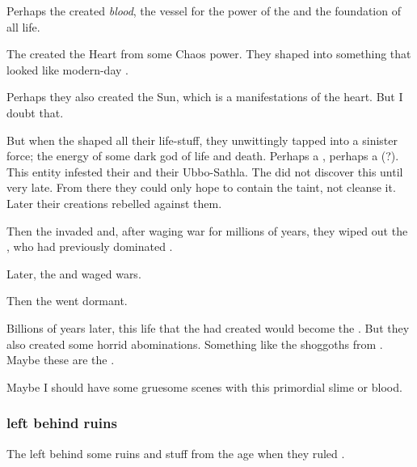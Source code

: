 Perhaps the \voyagers{} created \emph{blood}, the vessel for the power of the  and the foundation of all \Miithian{} life. 

The \voyagers{} created the Heart from some Chaos power. 
They shaped \Miith{} into something that looked like modern-day \Miith{}. 

Perhaps they also created the Sun, which is a manifestations of the heart. 
But I doubt that. 

But when the \voyagers{} shaped all their life-stuff, they unwittingly tapped into a sinister force; the energy of some dark god of life and death. 
Perhaps a \kraken, perhaps a \xs{} (?). 
This entity infested their \dweomers{} and their Ubbo-Sathla. 
The \voyagers{} did not discover this until very late. 
From there they could only hope to contain the taint, not cleanse it. 
Later their creations rebelled against them. 

Then the \xss{} invaded and, after waging war for millions of years, they wiped out the \voyagers{}, who had previously dominated \Miith{}. 


Later, the \xss{} and \krakens{} waged wars. 

Then the \xss{} went dormant. 

Billions of years later, this life that the \voyagers{} had created would become the \ophidians. 
But they also created some horrid abominations. 
Something like the shoggoths from . 
Maybe these are the . 

Maybe I should have some gruesome  scenes with this primordial slime or blood. 





\subsubsection{\Xzaishanns{} left behind ruins}
The \xss{} left behind some ruins and stuff from the age when they ruled \Miith{}. 

